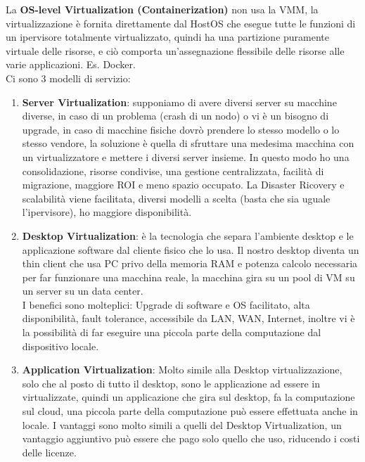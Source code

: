 \documentclass[11pt, twocolumn]{article}
\newenvironment{myenumerate}
{ \begin{enumerate}[topsep=0ex]
		\setlength{\itemsep}{0pt}
		\setlength{\parskip}{0pt}
		\setlength{\parsep}{0pt}     }
	{ \end{enumerate}                  }
\begin{document}
La \textbf{OS-level Virtualization (Containerization)} non usa la VMM, la virtualizzazione è fornita direttamente dal HostOS che esegue tutte le funzioni di un ipervisore totalmente virtualizzato, quindi ha una partizione puramente virtuale delle risorse, e ciò comporta un'assegnazione flessibile delle risorse alle varie applicazioni. Es. Docker.\\
Ci sono 3 modelli di servizio:
\begin{myenumerate}
	\item \textbf{Server Virtualization}: supponiamo di avere diversi server su macchine diverse, in caso di un problema (crash di un nodo) o vi è un bisogno di upgrade, in caso di macchine fisiche dovrò prendere lo stesso modello o lo stesso vendore, la soluzione è quella di sfruttare una medesima macchina con un virtualizzatore e mettere i diversi server insieme.
	In questo modo ho una consolidazione, risorse condivise, una gestione centralizzata, facilità di migrazione, maggiore ROI e meno spazio occupato.
	La Disaster Ricovery e scalabilità viene facilitata, diversi modelli a scelta (basta che sia uguale l'ipervisore), ho maggiore disponibilità.
	\item \textbf{Desktop Virtualization}: è la tecnologia che separa l'ambiente desktop e le applicazione software dal cliente fisico che lo usa. 
	Il nostro desktop diventa un thin client che usa PC privo della memoria RAM e potenza calcolo necessaria per far funzionare una macchina reale, la macchina gira su un pool di VM su un server su un data center.\\
	I benefici sono molteplici: Upgrade di software e OS facilitato, alta disponibilità, fault tolerance, accessibile da LAN, WAN, Internet, inoltre vi è la possibilità di far eseguire una piccola parte della computazione dal dispositivo locale.
	\item \textbf{Application Virtualization}: Molto simile alla Desktop virtualizzazione, solo che al posto di tutto il desktop, sono le applicazione ad essere in virtualizzate, quindi un applicazione che gira sul desktop, fa la computazione sul cloud, una piccola parte della computazione può essere effettuata anche in locale.
	I vantaggi sono molto simili a quelli del Desktop Virtualization, un vantaggio aggiuntivo può essere che pago solo quello che uso, riducendo i costi delle licenze.
\end{myenumerate}
\end{document}
